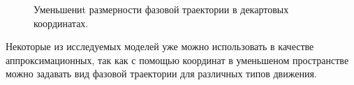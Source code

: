 \documentclass[12pt,twoside]{article}
\begin{document}
\begin{figure}[h]
\caption{Уменьшениt размерности фазовой траектории в декартовых координатах. }
\label{fg:new_traj_1}
\end{figure}

Некоторые из исследуемых моделей уже можно использовать в качестве аппроксимационных, так как с помощью координат в уменьшеном пространстве можно задавать вид фазовой траектории для различных типов движения.

\vspace{\baselineskip}
\end{document}
